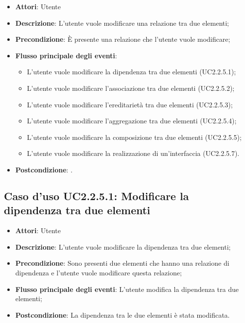 \documentclass[../AnalisiDeiRequisiti.tex]{subfiles}
\begin{document}
			\begin{itemize}
				\item \textbf{Attori}: Utente
				\item \textbf{Descrizione}: L'utente vuole modificare una relazione tra due elementi;
				\item \textbf{Precondizione}: È presente una relazione che l'utente vuole modificare;
				\item \textbf{Flusso principale degli eventi}: \begin{itemize}
					\item L'utente vuole modificare la dipendenza tra due elementi (UC2.2.5.1);
					\item L'utente vuole modificare l'associazione tra due elementi (UC2.2.5.2);
					\item L'utente vuole modificare l'ereditarietà tra due elementi (UC2.2.5.3);
					\item L'utente vuole modificare l'aggregazione tra due elementi (UC2.2.5.4);
					\item L'utente vuole modificare la composizione tra due elementi (UC2.2.5.5);
					\item L'utente vuole modificare la realizzazione di un'interfaccia (UC2.2.5.7).
				\end{itemize}
				\item \textbf{Postcondizione}: .
			\end{itemize}
			\subsection{Caso d'uso UC2.2.5.1: Modificare la dipendenza tra due elementi}
			\begin{itemize}
				\item \textbf{Attori}: Utente
				\item \textbf{Descrizione}: L'utente vuole modificare la dipendenza tra due elementi;
				\item \textbf{Precondizione}: Sono presenti due elementi che hanno una relazione di dipendenza e l'utente vuole modificare questa relazione;
				\item \textbf{Flusso principale degli eventi}: L'utente modifica la dipendenza tra due elementi;
				\item \textbf{Postcondizione}: La dipendenza tra le due elementi è stata modificata.
			\end{itemize}
\end{document}
